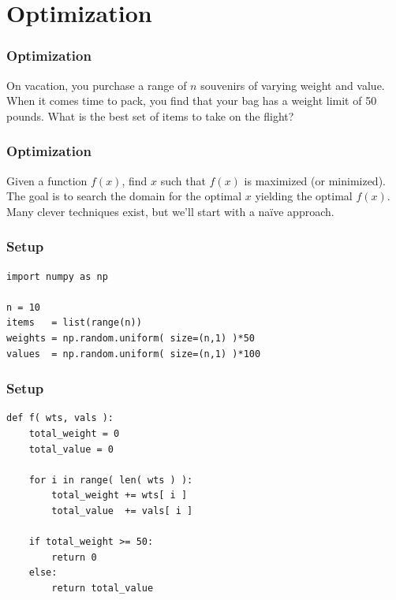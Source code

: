 \documentclass[11pt]{beamer}
\begin{document}
\section{Optimization}

\begin{frame}[fragile]
  \frametitle{Optimization}
  \Enlarge

  On vacation, you purchase a range of $n$ souvenirs of varying weight and value.  When it comes time to pack, you find that your bag has a weight limit of 50 pounds.  What is the best set of items to take on the flight?
\end{frame}

\begin{frame}[fragile]
  \frametitle{Optimization}
  \Enlarge

  \begin{enumerate}
  \myitem  Given a function $f(x)$, find $x$ such that $f(x)$ is maximized (or minimized).
  \myitem  The goal is to search the domain for the optimal $x$ yielding the optimal $f(x)$.
  \myitem  Many clever techniques exist, but we'll start with a na\"{i}ve approach.
  \end{enumerate}
\end{frame}

\begin{frame}[fragile]
  \frametitle{Setup}
  \Enlarge

  \begin{Verbatim}
import numpy as np

n = 10
items   = list(range(n))
weights = np.random.uniform( size=(n,1) )*50
values  = np.random.uniform( size=(n,1) )*100
  \end{Verbatim}
\end{frame}

\begin{frame}[fragile]
  \frametitle{Setup}

  \begin{Verbatim}
def f( wts, vals ):
    total_weight = 0
    total_value = 0

    for i in range( len( wts ) ):
        total_weight += wts[ i ]
        total_value  += vals[ i ]

    if total_weight >= 50:
        return 0
    else:
        return total_value
  \end{Verbatim}
\end{frame}
\end{document}
